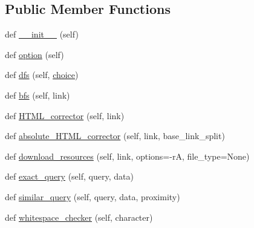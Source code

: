 \subsection*{Public Member Functions}
\begin{DoxyCompactItemize}
\item 
def \hyperlink{classpylinkvalidator_1_1_p_o_c_01_code_1_1_web___crawler_1_1_web___crawler_a11f494a5019e83e4e97de9d02e70eac0}{\+\_\+\+\_\+init\+\_\+\+\_\+} (self)
\item 
def \hyperlink{classpylinkvalidator_1_1_p_o_c_01_code_1_1_web___crawler_1_1_web___crawler_ab88f99b20a665b945bbfbacd29c7cd35}{option} (self)
\item 
def \hyperlink{classpylinkvalidator_1_1_p_o_c_01_code_1_1_web___crawler_1_1_web___crawler_a56ce7ff8f340a4e3a12fa6af7aa685ef}{dfs} (self, \hyperlink{classpylinkvalidator_1_1_p_o_c_01_code_1_1_web___crawler_1_1_web___crawler_a4100bfbd077cd54c5ee1b6e3ad21ba05}{choice})
\item 
def \hyperlink{classpylinkvalidator_1_1_p_o_c_01_code_1_1_web___crawler_1_1_web___crawler_a5fc56f19ac8d7aa5a6f1dcc2dd2c7f43}{bfs} (self, link)
\item 
def \hyperlink{classpylinkvalidator_1_1_p_o_c_01_code_1_1_web___crawler_1_1_web___crawler_a685b38e7e243a8edbae39c1ee31ba866}{H\+T\+M\+L\+\_\+corrector} (self, link)
\item 
def \hyperlink{classpylinkvalidator_1_1_p_o_c_01_code_1_1_web___crawler_1_1_web___crawler_ac4ba57c891836fb48a2115d51538e9bc}{absolute\+\_\+\+H\+T\+M\+L\+\_\+corrector} (self, link, base\+\_\+link\+\_\+split)
\item 
def \hyperlink{classpylinkvalidator_1_1_p_o_c_01_code_1_1_web___crawler_1_1_web___crawler_a70b41cbe1f381fd211536be5b6ab6c49}{download\+\_\+resources} (self, link, options=\textquotesingle{}-\/rA\textquotesingle{}, file\+\_\+type=None)
\item 
def \hyperlink{classpylinkvalidator_1_1_p_o_c_01_code_1_1_web___crawler_1_1_web___crawler_afbaad82f02609f768b0c7fd9baa83048}{exact\+\_\+query} (self, query, data)
\item 
def \hyperlink{classpylinkvalidator_1_1_p_o_c_01_code_1_1_web___crawler_1_1_web___crawler_a0ac2dcc6a346b596678fd923ce62c422}{similar\+\_\+query} (self, query, data, proximity)
\item 
def \hyperlink{classpylinkvalidator_1_1_p_o_c_01_code_1_1_web___crawler_1_1_web___crawler_ad00325e9391b34decc4960520f929deb}{whitespace\+\_\+checker} (self, character)
\item 

\end{DoxyCompactItemize}
